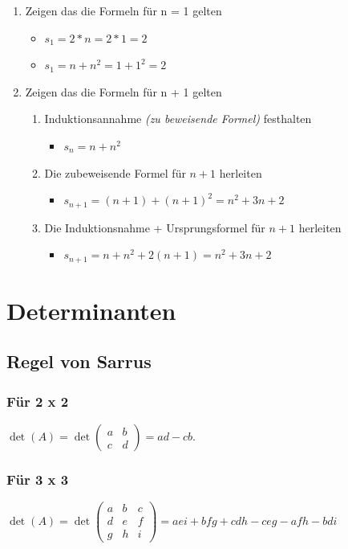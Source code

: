\documentclass[a4paper,12pt]{scrartcl}
\begin{document}
\begin{enumerate}
\item Zeigen das die Formeln für n = 1 gelten

\begin{itemize}
\item $s_1 = 2 * n = 2 * 1 = 2$
\item $s_1 = n + n^2 = 1 + 1^2 = 2$
\end{itemize}

\item Zeigen das die Formeln für n + 1 gelten
\begin{enumerate}
\item Induktionsannahme \textit{(zu beweisende Formel)} festhalten 
\begin{itemize}
\item $s_n = n + n^2$
\end{itemize}

\item Die zubeweisende Formel für $n + 1$ herleiten
\begin{itemize}
\item $s_{n+1} = (n+1) + (n+1)^2 = n^2 + 3n + 2$
\end{itemize}

\item Die Induktionsnahme + Ursprungsformel für $n + 1$ herleiten
\begin{itemize}
\item $s_{n+1} =  n + n^2 + 2 (n+1) = n^2 + 3n + 2$
\end{itemize}
\end{enumerate}
\end{enumerate}

\newpage
\section{Determinanten}
\subsection{Regel von Sarrus}
\subsubsection{Für 2 x 2}

$
\det(A) = 
\det \begin{pmatrix}
a & b \\ 
c & d 
\end{pmatrix} = ad - cb.
$

\subsubsection{Für 3 x 3}
$ \det(A) = \det
\begin{pmatrix}
  a & b & c \\
  d & e & f \\
  g & h & i
\end{pmatrix} = aei + bfg + cdh - ceg -afh -bdi
$
\end{document}
